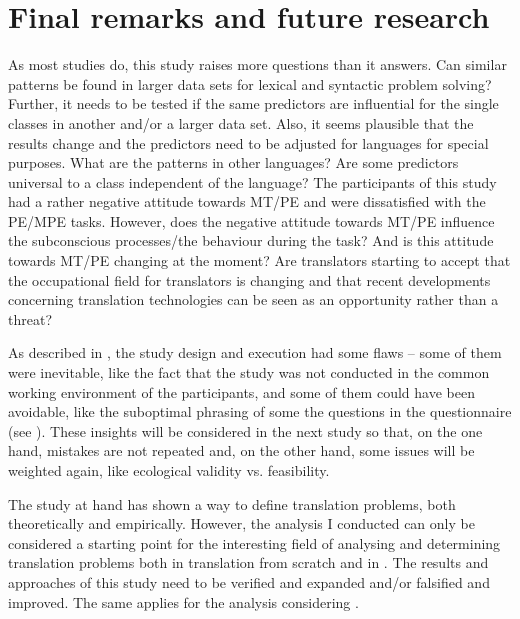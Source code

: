 \chapter{Final remarks and future research}
\label{sec:14}

As most studies do, this study raises more questions than it answers. Can similar patterns be found in larger data sets for lexical and syntactic problem solving? Further, it needs to be tested if the same predictors are influential for the single  classes in another and\slash or a larger data set. Also, it seems plausible that the results change and the predictors need to be adjusted for languages for special purposes. {What are the patterns in other languages? Are some predictors universal to a  class independent of the language? The participants of this study had a rather negative attitude towards MT\slash PE and were dissatisfied with the PE\slash MPE tasks. However, does the negative attitude towards MT\slash PE influence the subconscious processes\slash the behaviour during the task? And is this attitude towards MT\slash PE changing at the moment? Are translators starting to accept that the occupational field for translators is changing and that recent developments concerning translation technologies can be seen as an opportunity rather than a threat?}



{As described in , the study design and execution had some flaws – some of them were inevitable, like the fact that the study was not conducted in the common working environment of the participants, and some of them could have been avoidable, like the suboptimal phrasing of some the questions in the questionnaire (see ). These insights will be considered in the next study so that, on the one hand, mistakes are not repeated and, on the other hand, some issues will be weighted again, like ecological validity vs. feasibility.}



{The study at hand has shown a way to define translation problems, both theoretically and empirically. However, the analysis I conducted can only be considered a starting point for the interesting field of analysing and determining translation problems both in translation from scratch and in . The results and approaches of this study need to be verified and expanded and\slash or falsified and improved. The same applies for the analysis considering .}



